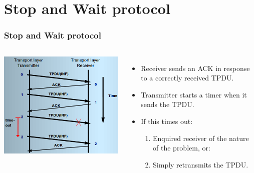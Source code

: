 \documentclass{beamer}
\begin{document}
\section{Stop and Wait protocol}
\begin{frame}
\frametitle{Stop and Wait protocol}
\begin{columns}[c]
\includegraphics[scale=0.55]{sw.png}
\begin{itemize}
\item Receiver sends an ACK in response to a correctly received TPDU.
\item Transmitter starts a timer when it sends the TPDU.
\item If this times out:
\begin{enumerate}
\item Enquired receiver of the nature of the problem, or:
\item Simply retransmits the TPDU.
\end{enumerate}
\end{itemize}
\end{columns}
\end{frame}
\end{document}

